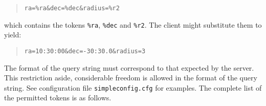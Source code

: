 \documentclass[twoside,11pt]{article}
\renewcommand{\_}{\texttt{\symbol{95}}}
\begin{document}
\begin{quote}
\verb-ra=%ra&dec=%dec&radius=%r2-
\end{quote}

which contains the tokens {\tt \%ra}, {\tt \%dec} and {\tt \%r2}.  The
client might substitute them to yield:

\begin{quote}
\begin{verbatim}
ra=10:30:00&dec=-30:30.0&radius=3
\end{verbatim}
\end{quote}

The format of the query string must correspond to that expected by the
server.  This restriction aside, considerable freedom is allowed in the
format of the query string.  See configuration file {\tt simpleconfig.cfg}
for examples.  The complete list of the permitted tokens is as follows.
\end{document}
